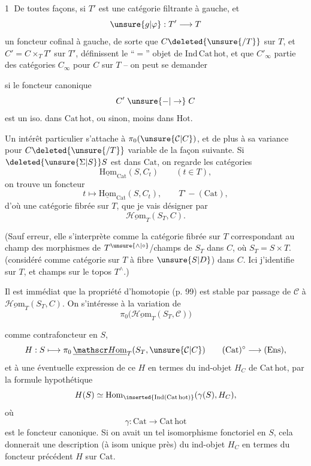 \textcircled{1} De toutes façons, si $T'$ est une  catégorie filtrante à gauche, et
\[
\unsure{g|\varphi}:T'\longrightarrow T
\]
un foncteur cofinal à gauche,  de sorte que $C\deleted{\unsure{/T}}$ sur $T$, et $C'=C\times_T T'$ sur $T'$, définissent  le ``$=$'' objet de $\mathrm{Ind\,Cat\,hot}$, et que  $C'_\infty$   partie des catégories $C_\infty$ pour $C$ sur $T$ -- on peut se demander


si le foncteur canonique
\[
C'\mathrel{\unsure{-|\to}}C
\]
est  un iso. dans $\mathrm{Cat\,hot}$, ou sinon,  moins dans $\mathrm{Hot}$.

Un intérêt particulier s'attache à $\pi_0(\unsure{\mathcal C|C})$, et de plus à sa variance pour $C\deleted{\unsure{/T}}$  variable de la façon suivante. Si $\deleted{\unsure{\Sigma|S}}S$ est dans $\mathrm{Cat}$, on regarde les catégories
\[
\underline{\mathrm{Hom}}_{\mathrm{Cat}}(S,C_t)\qquad(t\in T),
\]
on trouve un foncteur
\[
t\longmapsto\underline{\mathrm{Hom}}_{\mathrm{Cat}}(S,C_t),\qquad T^\circ\mathrel{-}(\mathrm{Cat}),
\]
d'où une catégorie fibrée sur $T$, que je vais désigner par
\[
\underline{\mathscr H\mathrm{om}}_T(S_T,C).
\]

(Sauf erreur, elle s'interprète comme la catégorie fibrée sur $T$ correspondant au champ  des morphismes de $T^{\unsure{\wedge|\circ}}$/champs de $S_T$ dans $C$, où $S_T=S\times T$. (considéré comme catégorie  sur $T$ à fibre   $\unsure{S|D}$) dans $C$. Ici j'identifie  sur $T$, et champs sur le topos $T^\wedge$.)

Il est immédiat que  la propriété d'homotopie (p. 99) est stable par passage de $\mathcal C$ à $\underline{\mathscr H\mathrm{om}}_T(S_T,C)$. On s'intéresse à la variation de
\[
\pi_0\bigl(\underline{\mathscr H\mathrm{om}}_T(S_T,\mathcal C)\bigr)
\]


comme contrafoncteur en $S$,
\[
H:S\longmapsto\pi_0\,\underline{\mathscr H\mathrm{om}}_T(S_T,\unsure{\mathcal C|C})\qquad(\mathrm{Cat})^\circ\longrightarrow(\mathrm{Ens}),
\]
et à une éventuelle expression de ce  $H$ en termes du ind-objet $H_C$ de $\mathrm{Cat\,hot}$, par la formule hypothétique
\[
H(S)\simeq\mathrm{Hom}_{\inserted{\mathrm{Ind}(\mathrm{Cat\,hot})}}(\gamma(S),H_C),
\]
où
\[
\gamma:\mathrm{Cat}\longrightarrow\mathrm{Cat\,hot}
\]
est le foncteur canonique. Si on avait un tel isomorphisme  fonctoriel en $S$, cela donnerait une description (à isom unique près) du ind-objet $H_C$ en termes du foncteur précédent $H$ sur $\mathrm{Cat}$. 

